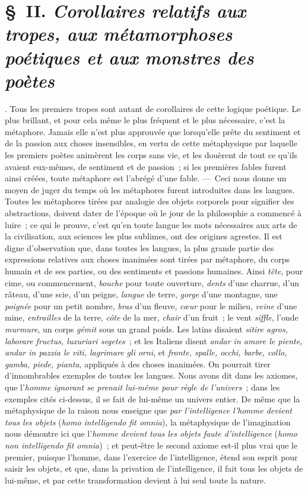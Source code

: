 \documentclass[french,twoside]{book} %
\begin{document}
\section[{§ II. Corollaires relatifs aux tropes, aux métamorphoses poétiques et aux monstres des poètes}]{§ II. {\itshape Corollaires relatifs aux tropes, aux métamorphoses poétiques et aux monstres des poètes}}
. Tous les premiers tropes sont autant de corollaires de cette logique poétique. Le plus brillant, et pour cela même le plus fréquent et le plus nécessaire, c’est la métaphore. Jamais elle n’est plus approuvée que lorsqu’elle prête du sentiment et de la passion aux choses insensibles, en vertu de cette métaphysique par laquelle les premiers poètes animèrent les corps sans vie, et les douèrent de tout ce qu’ils avaient eux-mêmes, de sentiment et de passion ; si les premières fables furent ainsi créées, toute métaphore est l’abrégé d’une fable. — Ceci nous donne un moyen de juger du temps où les métaphores furent introduites dans les langues. Toutes les métaphores tirées par analogie des objets corporels pour signifier des abstractions, doivent dater de l’époque où le jour de la philosophie a commencé à luire ; ce qui le prouve, c’est qu’en toute langue les mots nécessaires aux arts de la civilisation, aux sciences les plus sublimes, ont des origines agrestes. Il est digne d’observation que, dans toutes les langues, la plus grande partie des expressions relatives  aux choses inanimées sont tirées par métaphore, du corps humain et de ses parties, ou des sentiments et passions humaines. Ainsi {\itshape tête}, pour cime, ou commencement, {\itshape bouche} pour toute ouverture, {\itshape dents} d’une charrue, d’un râteau, d’une scie, d’un peigne, {\itshape langue} de terre, {\itshape gorge} d’une montagne, une {\itshape poignée} pour un petit nombre, {\itshape bras} d’un fleuve, {\itshape cœur} pour le milieu, {\itshape veine} d’une mine, {\itshape entrailles} de la terre, {\itshape côte} de la mer, {\itshape chair} d’un fruit ; le vent {\itshape siffle}, l’onde {\itshape murmure}, un corps {\itshape gémit} sous un grand poids. Les latins disaient {\itshape sitire agros, laborare fructus, luxuriari segetes} ; et les Italiens disent {\itshape andar in amore le piente, andar in pazzia le viti, lagrimare gli orni}, et {\itshape fronte, spalle, occhi, barbe, collo, gamba, piede, pianta}, appliqués à des choses inanimées. On pourrait tirer d’innombrables exemples de toutes les langues. Nous avons dit dans les axiomes, que l’{\itshape homme ignorant se prenait lui-même pour règle de l’univers} ; dans les exemples cités ci-dessus, il se fait de lui-même un univers entier. De même que la métaphysique de la raison nous enseigne que {\itshape par l’intelligence l’homme devient tous les objets} (\emph{{\itshape homo intelligendo fit omnia}}), la métaphysique de l’imagination nous démontre ici que l’{\itshape homme devient tous les objets faute d’intelligence} (\emph{{\itshape homo non intelligendo fit omnia}}) ; et peut-être le second axiome est-il plus vrai que le premier, puisque l’homme, dans l’exercice de l’intelligence, étend son esprit pour saisir les objets, et que, dans la privation de l’intelligence, il fait tous les objets de lui-même, et par cette  transformation devient à lui seul toute la nature.\par
\end{document}
